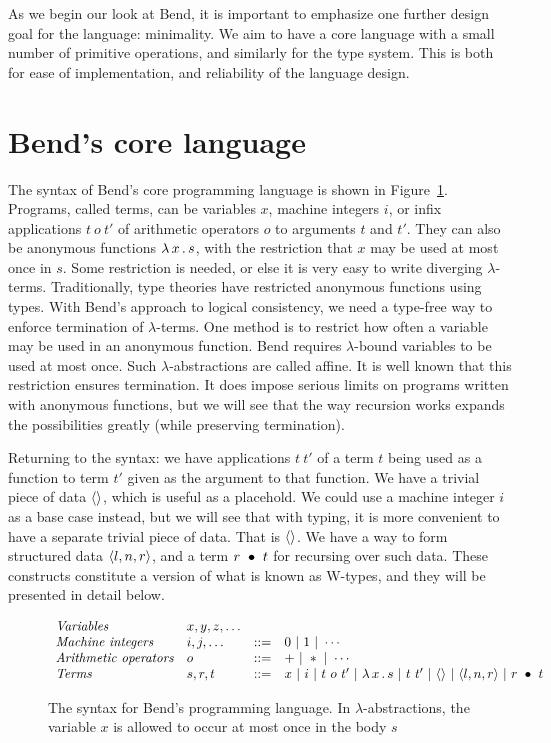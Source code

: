 \documentclass{article}
\begin{document}
As we begin our look at Bend, it is important to emphasize one further
design goal for the language: minimality.  We aim to have a core
language with a small number of primitive operations, and similarly
for the type system.  This is both for ease of implementation, and
reliability of the language design.

\section{Bend's core language}

The syntax of Bend's core programming language is shown in
Figure~\ref{fig:pl}.  Programs, called terms, can be variables $x$,
machine integers $i$, or infix applications $t\ o\ t'$ of arithmetic
operators $o$ to arguments $t$ and $t'$.  They can also be anonymous
functions $\lambda\, x\, .\, s$, with the restriction that $x$ may be used at
most once in $s$.  Some restriction is needed, or else it is very easy
to write diverging $\lambda$-terms.  Traditionally, type theories have
restricted anonymous functions using types.  With Bend's approach to
logical consistency, we need a type-free way to enforce termination of
$\lambda$-terms.  One method is to restrict how often a variable may
be used in an anonymous function.  Bend requires $\lambda$-bound
variables to be used at most once.  Such $\lambda$-abstractions are
called affine.  It is well known that this restriction ensures
termination.  It does impose serious limits on programs written with
anonymous functions, but we will see that the way recursion works
expands the possibilities greatly (while preserving termination).

Returning to the syntax: we have applications $t\ t'$ of a term $t$
being used as a function to term $t'$ given as the argument to that
function.  We have a trivial piece of data $\langle\rangle$, which is useful as
a placehold.  We could use a machine integer $i$ as a base case
instead, but we will see that with typing, it is more convenient to
have a separate trivial piece of data.  That is $\langle\rangle$.  We have a
way to form structured data $\langle l , n, r \rangle$, and a term $r\ \bullet\ t$
for recursing over such data.  These constructs constitute a version of
what is known as W-types, and they will be presented in detail below.

\begin{figure}
  \[
  \begin{array}{llll}
    \textit{Variables}  & x,y,z,\ldots & \ &\ \\
    \textit{Machine integers}  & i,j,\ldots & ::= & 0\ |\ 1\ | \ \cdots \\
    \textit{Arithmetic operators} & o & ::= & +\ |\ *\ |\ \cdots \\        
    \textit{Terms} & s,r,t & ::= & x\ |\ i\ |\ t\ o\ t'\ |\ \lam{x}{s}\ |\ t\ t'\ |\ \wunit\ |\ \ctor{l}{n}{r}\ |\ \wrec{r}{t}
  \end{array}
\]
\caption{The syntax for Bend's programming language.  In $\lambda$-abstractions, the variable $x$ is allowed
  to occur at most once in the body $s$}
\label{fig:pl}
\end{figure}
\end{document}
